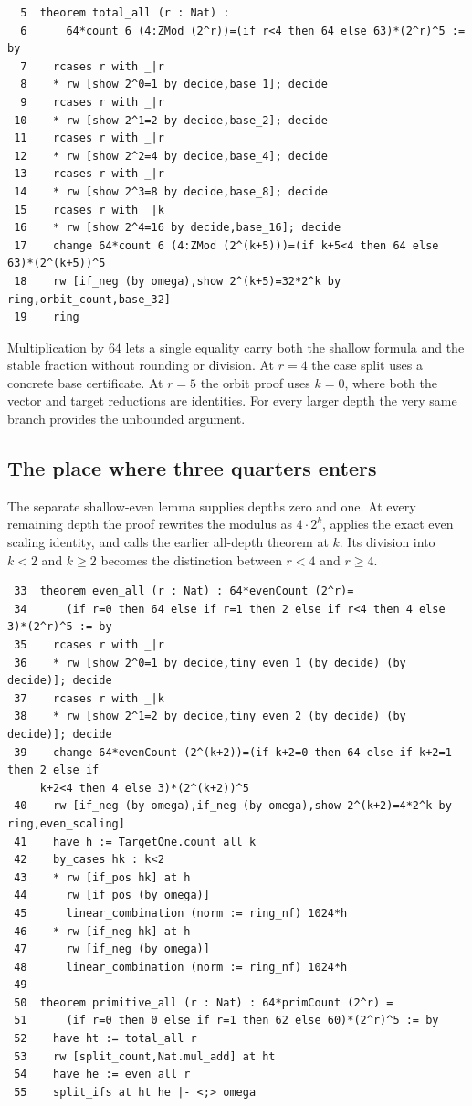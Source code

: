 \documentclass[12pt,letterpaper]{article}
\begin{document}
{\fontsize{9.2}{11.2}\selectfont\begin{verbatim}
  5  theorem total_all (r : Nat) :
  6      64*count 6 (4:ZMod (2^r))=(if r<4 then 64 else 63)*(2^r)^5 := by
  7    rcases r with _|r
  8    * rw [show 2^0=1 by decide,base_1]; decide
  9    rcases r with _|r
 10    * rw [show 2^1=2 by decide,base_2]; decide
 11    rcases r with _|r
 12    * rw [show 2^2=4 by decide,base_4]; decide
 13    rcases r with _|r
 14    * rw [show 2^3=8 by decide,base_8]; decide
 15    rcases r with _|k
 16    * rw [show 2^4=16 by decide,base_16]; decide
 17    change 64*count 6 (4:ZMod (2^(k+5)))=(if k+5<4 then 64 else 63)*(2^(k+5))^5
 18    rw [if_neg (by omega),show 2^(k+5)=32*2^k by ring,orbit_count,base_32]
 19    ring
\end{verbatim}}
Multiplication by $64$ lets a single equality carry both the shallow formula and the stable fraction without rounding or division. At $r=4$ the case split uses a concrete base certificate. At $r=5$ the orbit proof uses $k=0$, where both the vector and target reductions are identities. For every larger depth the very same branch provides the unbounded argument.
\clearpage{}\subsection*{The place where three quarters enters}\label{extract-FourCounts33}
The separate shallow-even lemma supplies depths zero and one. At every remaining depth the proof rewrites the modulus as $4\cdot2^k$, applies the exact even scaling identity, and calls the earlier all-depth theorem at $k$. Its division into $k<2$ and $k\ge2$ becomes the distinction between $r<4$ and $r\ge4$.
\par
{\fontsize{9.2}{11.2}\selectfont\begin{verbatim}
 33  theorem even_all (r : Nat) : 64*evenCount (2^r)=
 34      (if r=0 then 64 else if r=1 then 2 else if r<4 then 4 else 3)*(2^r)^5 := by
 35    rcases r with _|r
 36    * rw [show 2^0=1 by decide,tiny_even 1 (by decide) (by decide)]; decide
 37    rcases r with _|k
 38    * rw [show 2^1=2 by decide,tiny_even 2 (by decide) (by decide)]; decide
 39    change 64*evenCount (2^(k+2))=(if k+2=0 then 64 else if k+2=1 then 2 else if
     k+2<4 then 4 else 3)*(2^(k+2))^5
 40    rw [if_neg (by omega),if_neg (by omega),show 2^(k+2)=4*2^k by ring,even_scaling]
 41    have h := TargetOne.count_all k
 42    by_cases hk : k<2
 43    * rw [if_pos hk] at h
 44      rw [if_pos (by omega)]
 45      linear_combination (norm := ring_nf) 1024*h
 46    * rw [if_neg hk] at h
 47      rw [if_neg (by omega)]
 48      linear_combination (norm := ring_nf) 1024*h
 49
 50  theorem primitive_all (r : Nat) : 64*primCount (2^r) =
 51      (if r=0 then 0 else if r=1 then 62 else 60)*(2^r)^5 := by
 52    have ht := total_all r
 53    rw [split_count,Nat.mul_add] at ht
 54    have he := even_all r
 55    split_ifs at ht he |- <;> omega
\end{verbatim}}
\end{document}

